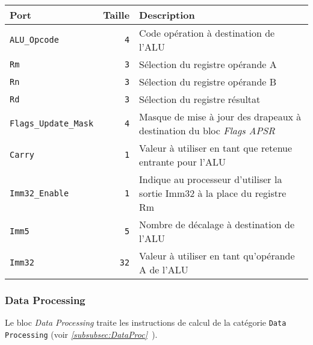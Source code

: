 \documentclass{article}
\begin{document}
    \begin{tabular}{|l|r|l|}
        \hline
        \textbf{Port}                 & \textbf{Taille} & \textbf{Description}                                                         \\
        \hline

        \texttt{ALU\_Opcode}        & \texttt{4}      & Code opération à destination de l'ALU                                        \\
        \hline
        \texttt{Rm}                & \texttt{3}      & Sélection du registre opérande A                                             \\
        \hline
        \texttt{Rn}                & \texttt{3}      & Sélection du registre opérande B                                             \\
        \hline
        \texttt{Rd}                & \texttt{3}      & Sélection du registre résultat                                               \\
        \hline
        \texttt{Flags\_Update\_Mask} & \texttt{4}      & Masque de mise à jour des drapeaux à destination du bloc \textit{Flags APSR} \\
        \hline
        \texttt{Carry}             & \texttt{1}      & Valeur à utiliser en tant que retenue entrante pour l'ALU                    \\
        \hline
        \texttt{Imm32\_Enable}      & \texttt{1}      & Indique au processeur d'utiliser la sortie Imm32 à la place du registre Rm   \\
        \hline
        \texttt{Imm5}              & \texttt{5}      & Nombre de décalage à destination de l'ALU                                    \\
        \hline
        \texttt{Imm32}             & \texttt{32}     & Valeur à utiliser en tant qu'opérande A de l'ALU                             \\

        \hline
    \end{tabular}

    \subsubsection{Data Processing}
    \label{sec:DataProc}

    Le bloc \textit{Data Processing} traite les instructions de calcul de la catégorie \texttt{Data Processing} (voir \textit{\ref{subsubsec:DataProc}~}).
\end{document}
